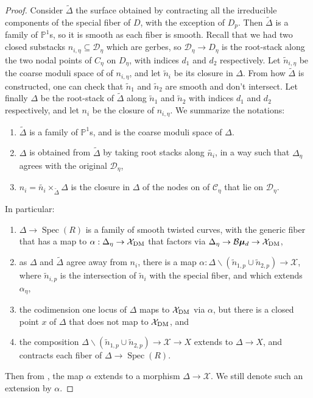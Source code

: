 \documentclass{amsart}
\newcommand{\bP}{\mathbb{P}}
\newcommand{\cB}{\mathcal{B}}
\newcommand{\cC}{\mathcal{C}}
\newcommand{\cD}{\mathcal{D}}
\newcommand{\cX}{\mathcal{X}}
\newcommand{\spec}{\operatorname{Spec}}
\newcommand{\bmu}{\bm{\mu}}
\newcommand{\dm}{{\rm DM}}
\theoremstyle{definition}
\theoremstyle{definition}
\begin{document}
{\begin{proof}
     Consider $\widetilde{\Delta}$ the surface obtained by contracting all the irreducible components of the special fiber of $D$, with the exception of $D_p$. Then $\widetilde{\Delta}$ is a family of $\bP^1$s, so it is smooth as each fiber is smooth.
     Recall that we had two closed substacks $n_{i,\eta}\subseteq \cD_\eta$ which are gerbes, so $\cD_\eta\to D_\eta$ is the root-stack along the two nodal points of $C_\eta$ on $D_\eta$, with indices $d_1$ and $d_2$ respectively. Let $\widetilde{n}_{i,\eta}$ be the coarse moduli space of of ${n}_{i,\eta}$,
     and let $\widetilde{n}_{i}$ be its closure in $\Delta$. From how $\widetilde{\Delta}$ is constructed, one can check that $\widetilde{n}_{1}$ and $\widetilde{n}_{2}$ are smooth and don't intersect. Let finally $\Delta$ be the root-stack of $\widetilde{\Delta}$ along $\widetilde{n}_{1}$ and $\widetilde{n}_{2}$ with indices $d_1$ and $d_2$ respectively, and let $n_i$ be the closure of $n_{i,\eta}$. We summarize the notations:
     \begin{enumerate}
         \item $\widetilde{\Delta}$ is a family of $\bP^1$s, and is the coarse moduli space of $\Delta$.
         \item $\Delta$ is obtained from $\widetilde{\Delta}$ by taking root stacks along $\widetilde{n_i}$, in a way such that $\Delta_\eta$ agrees with the original $\cD_\eta$,
         \item $n_i=\widetilde{n_i}\times_{\widetilde{\Delta}}\Delta$ is the closure in $\Delta$ of the nodes on of $\cC_\eta$ that lie on $\cD_\eta$.
     \end{enumerate}In particular:
     \begin{enumerate}
         \item $\Delta\to\spec(R)$ is a family of smooth twisted curves, with the generic fiber that has a map to $\alpha: \Delta_\eta\to \cX_\dm$ that factors via $\Delta_\eta\to \cB\bmu_d\to \cX_\dm$,
         \item as $\Delta$ and $\widetilde{\Delta}$ agree away from $n_{i}$, there is a map $\alpha:\Delta \smallsetminus (\widetilde{n}_{1,p}\cup \widetilde{n}_{2,p})\to \cX$, where $\widetilde{n}_{i,p}$ is the intersection of $\widetilde{n}_{i}$ with the special fiber, and which extends $\alpha_\eta$,
         \item the codimension one locus of $\Delta$ maps to $\cX_\dm$ via $\alpha$, but there is a closed point $x$ of $\Delta$ that does not map to $\cX_\dm$, and
         \item the composition $\Delta \smallsetminus (\widetilde{n}_{1,p}\cup \widetilde{n}_{2,p})\to \cX\to X$ extends to $\Delta\to X$, and contracts each fiber of $\Delta\to\spec(R)$.
     \end{enumerate}
     Then from , the map $\alpha$ extends to a morphism $\Delta\to \cX$. We still denote such an extension by $\alpha.$ 


\end{proof}}
\end{document}
